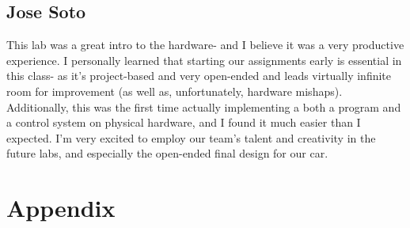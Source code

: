 \documentclass{article}
\begin{document}
\subsection{Jose Soto}
This lab was a great intro to the hardware- and I believe it was a very productive experience. I personally learned that starting our assignments early is essential in this class- as it's project-based and very open-ended and leads virtually infinite room for improvement (as well as, unfortunately, hardware mishaps). Additionally, this was the first time actually implementing a both a program and a control system on physical hardware, and I found it much easier than I expected. I'm very excited to employ our team's talent and creativity in the future labs, and especially the open-ended final design for our car.
\newpage 
\section{Appendix}
\end{document}
